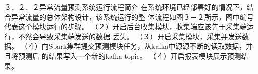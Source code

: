 ３．２．２异常流量预测系统运行流程简介
在系统环境已经部署好的情况下，结合异常流量的总体架构设计，该系统运行的整
体流程如图３－２所示，图中编号代表这个模块运行的步骤。
（２）开启后台收集模块，收集端应该先于采集端运行，不然会导致采集端发送的数据
丢失。
（３）开启采集模块，采集并发送数据。
（４）向Spark集群提交预测模块任务，从kafka中源源不断的读取数据，并且将预测后
的结果写入一个新的kafka topic。
（４）开启报表模块展示预测结果。